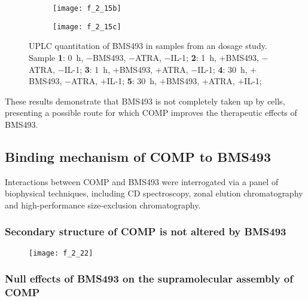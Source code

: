\begin{refsection}
\begin{figure}[h!]
    \begin{subfigure}[b]{0.45\textwidth}
        \texttt{[image: f\_2\_15b]}
        \caption{}
        \label{fig:culture_extracts_chrom_zoom}
    \end{subfigure}
    \begin{subfigure}[b]{0.45\textwidth}
        \texttt{[image: f\_2\_15c]}
        \caption{}
        \label{fig:culture_extracts_chart}
    \end{subfigure}
    \caption[UPLC quantitation of BMS493 in samples from an  dosage
    study]{UPLC quantitation of BMS493 in samples from an  dosage
    study. Sample \textbf{1}: \SI{0}{\hour}, ${-}$BMS493, ${-}$ATRA, ${-}$IL-1;
    \textbf{2}: \SI{1}{\hour}, ${+}$BMS493, ${-}$ATRA, ${-}$IL-1; 
    \textbf{3}: \SI{1}{\hour}, ${+}$BMS493, ${+}$ATRA, ${-}$IL-1; 
    \textbf{4}: \SI{30}{\hour}, ${+}$BMS493, ${-}$ATRA, ${+}$IL-1; 
    \textbf{5}: \SI{30}{\hour}, ${+}$BMS493, ${+}$ATRA, ${+}$IL-1; 
}\label{fig:uplc_report_culture_extracts}
\end{figure}
These results demonstrate that BMS493 is not completely taken up by cells,
presenting a possible route for which COMP improves the therapeutic effects of
BMS493.

\subsection{Binding mechanism of COMP to BMS493}

Interactions between COMP and BMS493 were interrogated via a panel of
biophysical techniques, including CD spectroscopy, zonal elution chromatography
and high-performance size-exclusion chromatography.

\subsubsection{Secondary structure of COMP is not altered by BMS493}

\begin{figure}[h!] \centering \texttt{[image: f\_2\_22]}
    \caption[]{\cite{}}\label{fig:} \end{figure}

\subsubsection{Null effects of BMS493 on the supramolecular assembly of COMP}


\end{refsection}
